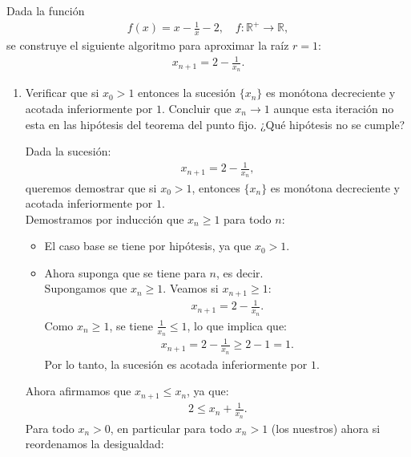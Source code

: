 \begin{homeworkProblem}
  Dada la función
  \begin{align*}
    f(x)=x-\frac{1}{x}-2,\quad f:\mathbb{R}^{+}\to \mathbb{R},
  \end{align*}
  se construye el siguiente algoritmo para aproximar la raíz $r=1$:
  \begin{align*}
    x_{n+1}=2-\frac{1}{x_n}.
  \end{align*}
  \begin{enumerate}
    \item Verificar que si $x_0>1$ entonces la sucesión $\{x_{n}\}$ es monótona decreciente y acotada inferiormente por $1$. Concluir que $x_n\to 1$ aunque esta iteración no esta en las hipótesis del teorema del punto fijo. ¿Qué hipótesis no se cumple?
      \begin{solucion}
        Dada la sucesión:
        \begin{align*}
          x_{n+1} = 2 - \frac{1}{x_n},
        \end{align*}
        queremos demostrar que si $x_0 > 1$, entonces $\{x_n\}$ es monótona decreciente y acotada inferiormente por $1$.\\
        Demostramos por inducción que $x_n \geq 1$ para todo $n$:
        \begin{itemize}
          \item El caso base se tiene por hipótesis, ya que $x_0>1$.
          \item Ahora suponga que se tiene para $n$, es decir.\\
            Supongamos que $x_n \geq 1$. Veamos si $x_{n+1} \geq 1$:
            \begin{align*}
              x_{n+1} = 2 - \frac{1}{x_n}.
            \end{align*}
            Como $x_n \geq 1$, se tiene $\frac{1}{x_n} \leq 1$, lo que implica que:
            \begin{align*}
              x_{n+1} = 2 - \frac{1}{x_n} \geq 2 - 1 = 1.
            \end{align*}
            Por lo tanto, la sucesión es acotada inferiormente por $1$.
        \end{itemize}     
        Ahora afirmamos que $x_{n+1} \leq x_n$, ya que:
        \begin{align*}
            2 \leq x_n + \frac{1}{x_n}.
        \end{align*}
        Para todo $x_n>0$, en particular para todo $x_n>1$ (los nuestros) ahora si reordenamos la desigualdad:

\end{solucion}
\end{enumerate}
\end{homeworkProblem}

